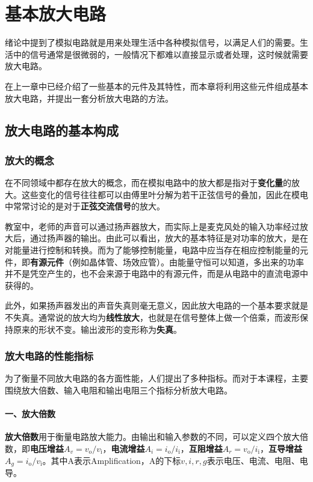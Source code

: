 \chapter{基本放大电路}
绪论中提到了模拟电路就是用来处理生活中各种模拟信号，以满足人们的需要。生活中的信号通常是很微弱的，一般情况下都难以直接显示或者处理，这时候就需要放大电路。

在上一章中已经介绍了一些基本的元件及其特性，而本章将利用这些元件组成基本放大电路，并提出一套分析放大电路的方法。

\section{放大电路的基本构成}

\subsection{放大的概念}
在不同领域中都存在放大的概念，而在模拟电路中的放大都是指对于\textbf{变化量}的放大。这些变化的信号往往都可以由傅里叶分解为若干正弦信号的叠加，因此在模电中常常讨论的是对于\textbf{正弦交流信号}的放大。

教室中，老师的声音可以通过扬声器放大，而实际上是麦克风处的输入功率经过放大后，通过扬声器的输出。由此可以看出，放大的基本特征是对功率的放大，是在对能量进行控制和转换。而为了能够控制能量，电路中应当存在相应控制能量的元件，即\textbf{有源元件}（例如晶体管、场效应管）。由能量守恒可以知道，多出来的功率并不是凭空产生的，也不会来源于电路中的有源元件，而是从电路中的直流电源中获得的。

此外，如果扬声器发出的声音失真则毫无意义，因此放大电路的一个基本要求就是不失真。通常说的放大均为\textbf{线性放大}，也就是在信号整体上做⼀个倍乘，而波形保持原来的形状不变。输出波形的变形称为\textbf{失真}。

\subsection{放大电路的性能指标}\label{放大电路的性能指标}
为了衡量不同放大电路的各方面性能，人们提出了多种指标。而对于本课程，主要围绕放大倍数、输入电阻和输出电阻三个指标分析放大电路。

\subsubsection{一、放大倍数}
\textbf{放大倍数}用于衡量电路放大能力。由输出和输入参数的不同，可以定义四个放大倍数，即\textbf{电压增益}$A_v=v_\mathrm{o}/v_\mathrm{i}$，\textbf{电流增益}$A_i=i_\mathrm{o}/i_\mathrm{i}$，\textbf{互阻增益}$A_r=v_\mathrm{o}/i_\mathrm{i}$，\textbf{互导增益}$A_g=i_\mathrm{o}/v_\mathrm{i}$。其中A表示Amplification，A的下标$v,i,r,g$表示电压、电流、电阻、电导。

